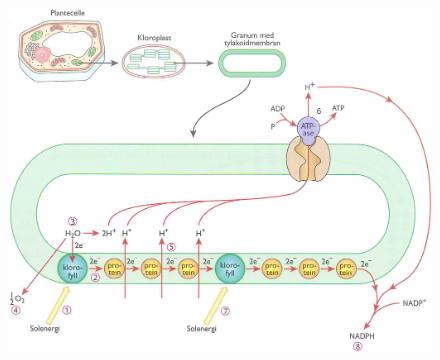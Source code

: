 \begin{figure}[H]
\centering
\includegraphics[width=\textwidth]{img/photosynthesis/light_dependent.png}
\end{figure}